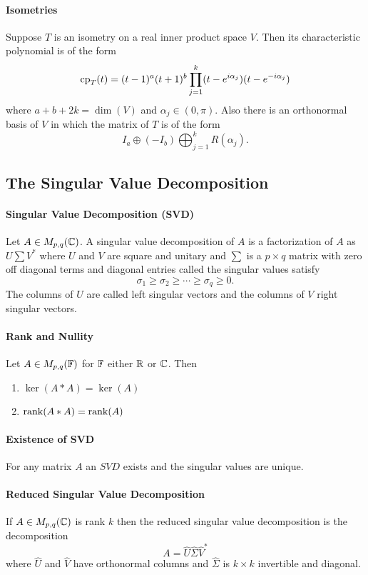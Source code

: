 \paragraph{Isometries}
Suppose \(T\) is an isometry on a real inner product space \(V\). Then its characteristic polynomial is of the form
\[\mathrm{cp}_T(t) = (t-1)^a(t+1)^b \prod_{j=1}^k(t - e^{i\alpha_j})(t-e^{-i\alpha_j})\]
where \(a + b + 2k = \dim(V)\) and \(\alpha_j \in (0 , \pi)\). Also there is an orthonormal basis of \(V\) in which the matrix of \(T\) is of the form
\[I_a \oplus (-I_b) \bigoplus_{j=1}^k R(\alpha_j).\]

\subsection{The Singular Value Decomposition}
\paragraph{Singular Value Decomposition (SVD)}
Let \(A \in M_{p,q}(\mathbb{C})\). A singular value decomposition of \(A\) is a factorization of \(A\) as \(U\sum V^*\) where \(U\) and \(V\) are square and unitary and \(\sum\) is a \(p \times q\) matrix with zero off diagonal terms and diagonal entries called the singular values satisfy
\[\sigma_1 \geq \sigma_2 \geq \cdots \geq \sigma_q \geq 0.\]
The columns of \(U\) are called left singular vectors and the columns of \(V\) right singular vectors.

\paragraph{Rank and Nullity}
Let \(A \in M_{p,q}(\mathbb{F})\) for \(\mathbb{F}\) either \(\mathbb{R}\) or \(\mathbb{C}\). Then
\begin{enumerate}[label = \alph*)]
    \item \(\ker(A*A) = \ker(A)\)
    \item \(\rank(A*A) = \rank(A)\)
\end{enumerate}

\paragraph{Existence of SVD}
For any matrix \(A\) an \(SVD\) exists and the singular values are unique.

\paragraph{Reduced Singular Value Decomposition}
If \(A \in M_{p,q}(\mathbb{C})\) is rank \(k\) then the reduced singular value decomposition is the decomposition
\[A = \hat{U}\hat{\Sigma}\hat{V}^*\]
where \(\hat{U}\) and \(\hat{V}\) have orthonormal columns and \(\hat{\Sigma}\) is \(k \times k\) invertible and diagonal.

